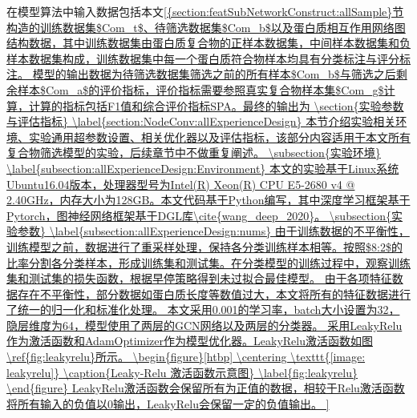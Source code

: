 在模型算法中输入数据包括本文\ref{{section:featSubNetworkConstruct:allSample}节构造的训练数据集$Com_t$、待筛选数据集$Com_b$以及蛋白质相互作用网络图结构数据，其中训练数据集由蛋白质复合物的正样本数据集，中间样本数据集和负样本数据集构成，训练数据集中每一个蛋白质符合物样本均具有分类标注与评分标注。

模型的输出数据为待筛选数据集筛选之前的所有样本$Com_b$与筛选之后剩余样本$Com_a$的评价指标，评价指标需要参照真实复合物样本集$Com_g$计算，计算的指标包括F1值和综合评价指标SPA。最终的输出为

\section{实验参数与评估指标}
\label{section:NodeConv:allExperienceDesign}
本节介绍实验相关环境、实验通用超参数设置、相关优化器以及评估指标，该部分内容适用于本文所有复合物筛选模型的实验，后续章节中不做重复阐述。

\subsection{实验环境}
\label{subsection:allExperienceDesign:Environment}

本文的实验基于Linux系统Ubuntu16.04版本，处理器型号为Intel(R) Xeon(R) CPU E5-2680 v4 @ 2.40GHz，内存大小为128GB。本文代码基于Python编写，其中深度学习框架基于Pytorch，图神经网络框架基于DGL库\cite{wang_deep_2020}。

\subsection{实验参数}
\label{subsection:allExperienceDesign:nums}

由于训练数据的不平衡性，训练模型之前，数据进行了重采样处理，保持各分类训练样本相等。按照$8:2$的比率分割各分类样本，形成训练集和测试集。在分类模型的训练过程中，观察训练集和测试集的损失函数，根据早停策略得到未过拟合最佳模型。
由于各项特征数据存在不平衡性，部分数据如蛋白质长度等数值过大，本文将所有的特征数据进行了统一的归一化和标准化处理。

本文采用0.001的学习率，batch大小设置为32，隐层维度为64，模型使用了两层的GCN网络以及两层的分类器。
采用LeakyRelu作为激活函数和AdamOptimizer作为模型优化器。LeakyRelu激活函数如图\ref{fig:leakyrelu}所示。

\begin{figure}[htbp]
    \centering
    \texttt{[image: leakyrelu]}
    \caption{Leaky-Relu 激活函数示意图}
    \label{fig:leakyrelu}
\end{figure}
LeakyRelu激活函数会保留所有为正值的数据，相较于Relu激活函数将所有输入的负值以0输出，LeakyRelu会保留一定的负值输出。


}
